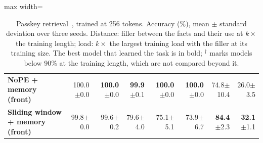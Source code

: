\begin{table}
\begin{adjustbox}{max width=\linewidth}
\begin{tabular}{lrrrrrrr}
\textbf{NoPE + memory (front)} & 100.0{\scriptsize$\pm$0.0} & \textbf{100.0}{\scriptsize$\pm$0.0} & \textbf{99.9}{\scriptsize$\pm$0.1} & \textbf{100.0}{\scriptsize$\pm$0.0} & \textbf{100.0}{\scriptsize$\pm$0.0} & 74.8{\scriptsize$\pm$10.4} & 26.0{\scriptsize$\pm$3.5} \\
\textbf{Sliding window + memory (front)} & 99.8{\scriptsize$\pm$0.0} & 99.6{\scriptsize$\pm$0.2} & 79.6{\scriptsize$\pm$4.0} & 75.1{\scriptsize$\pm$5.1} & 73.9{\scriptsize$\pm$6.7} & \textbf{84.4}{\scriptsize$\pm$2.3} & \textbf{32.1}{\scriptsize$\pm$1.1} \\
\bottomrule
\end{tabular}
\end{adjustbox}
\caption{Passkey retrieval~\citep{mohtashami2023landmark}, trained at 256 tokens. Accuracy (\%), mean $\pm$ standard deviation over three seeds. Distance: filler between the facts and their use at $k\times$ the training length; load: $k\times$ the largest training load with the filler at its training size. The best model that learned the task is in bold; $^\dagger$ marks models below 90\% at the training length, which are not compared beyond it.}
\label{tab:passkey}
\end{table}
